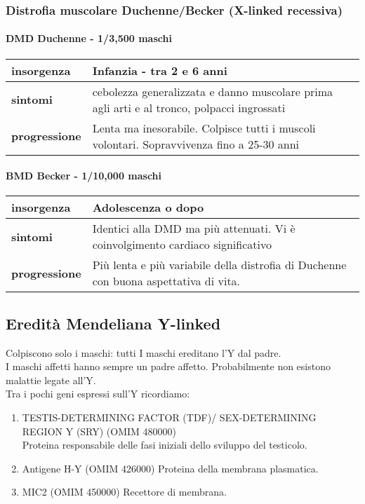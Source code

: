 \documentclass{article}
\begin{document}
\subsubsection{Distrofia muscolare Duchenne/Becker (X-linked recessiva)}
\paragraph{DMD Duchenne - 1/3,500 maschi}
\begin{center}
    \begin{tabular}{lp{}}
        \toprule
        \textbf{insorgenza} & Infanzia - tra 2 e 6 anni\\
        \midrule
        \textbf{sintomi} & cebolezza generalizzata e danno muscolare prima agli arti e al tronco, polpacci ingrossati\\
        \midrule
        \textbf{progressione} & Lenta ma inesorabile. Colpisce tutti i muscoli volontari. Sopravvivenza fino a 25-30 anni\\
        \bottomrule
    \end{tabular}
\end{center}

\paragraph{BMD Becker - 1/10,000 maschi}
\begin{center}
    \begin{tabular}{lp{}}
        \toprule
        \textbf{insorgenza} & Adolescenza o dopo\\
        \midrule
        \textbf{sintomi} & Identici alla DMD ma più attenuati. Vi è coinvolgimento cardiaco significativo\\
        \midrule
        \textbf{progressione} &  Più lenta e più variabile della distrofia di Duchenne con buona aspettativa di vita.\\
        \bottomrule
    \end{tabular}
\end{center}
\subsection{Eredità Mendeliana Y-linked}Colpiscono solo i maschi: tutti I maschi ereditano l'Y
dal padre.\\I maschi affetti hanno sempre un padre affetto. Probabilmente non esistono malattie legate all'Y.\\
Tra i pochi geni espressi sull'Y ricordiamo:
\begin{enumerate}
    \item TESTIS-DETERMINING FACTOR (TDF)/ SEX-DETERMINING REGION Y (SRY) (OMIM 480000)\\
    Proteina responsabile delle fasi iniziali dello sviluppo del testicolo.
    \item Antigene H-Y (OMIM 426000) Proteina della membrana plasmatica.
    \item MIC2 (OMIM 450000) Recettore di membrana.
\end{enumerate}
\end{document}

